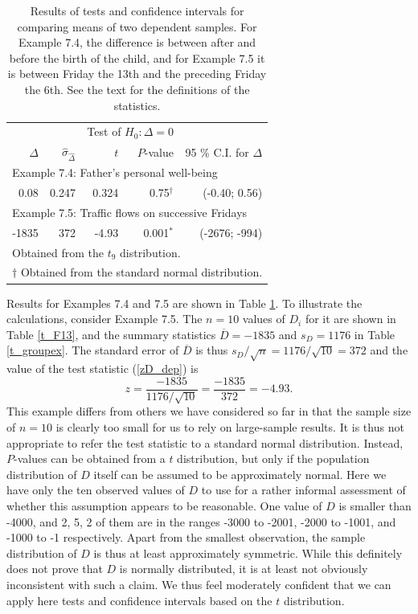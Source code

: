 \begin{table}
\caption{Results of tests and confidence intervals for comparing
means of two dependent samples. For Example 7.4, the difference
is between after and before the birth of the child, and
for Example 7.5 it is between Friday the 13th and the preceding Friday
the 6th.
See the text for the
definitions of the statistics.}
\label{t_2tests_dep}

\begin{center}
\begin{tabular}{|rrrrr|}\hline
& & \multicolumn{2}{r}{Test of $H_{0}: \Delta=0$} & \\
$\hat{\Delta}$& $\hat{\sigma}_{\hat{\Delta}}$& $t$ & $P$-value &
95 \% C.I. for $\Delta$ \\ \hline
\multicolumn{5}{|l|}{Example 7.4: Father's personal well-being}\\
0.08 & 0.247 & 0.324 & 0.75$^{\dagger}$ & (-0.40; 0.56) \\
\hline
\multicolumn{5}{|l|}{Example 7.5: Traffic flows on successive
Fridays}\\
-1835 & 372 & -4.93 & 0.001$^{*}$ & (-2676; -994) \\
\hline
\multicolumn{5}{l}{{\footnotesize * Obtained from the $t_{9}$
distribution.}}\\
\multicolumn{5}{l}{{\footnotesize $\dagger$ Obtained from the
standard normal distribution.}}
\end{tabular}
\end{center}
\end{table}


Results for Examples 7.4 and 7.5 are shown in Table
\ref{t_2tests_dep}. To illustrate the calculations, consider Example
7.5. The $n=10$ values of $D_{i}$ for it are shown in Table \ref{t_F13},
and the summary statistics $\overline{D}=-1835$ and $s_{D}=1176$ in
Table \ref{t_groupex}. The standard error of $\overline{D}$ is thus
$s_{D}/\sqrt{n}=1176/\sqrt{10}=372$ and the value of the test
statistic (\ref{zD_dep}) is
\[
z=\frac{-1835}{1176/\sqrt{10}}=\frac{-1835}{372}=-4.93.
\]
This example differs from others we have considered so far in that the
sample size of $n=10$ is clearly too small for us to rely on
large-sample results. It is thus not appropriate to
refer the test statistic to a standard normal
distribution. Instead, $P$-values can be obtained from a
$t$ distribution, but only if the population distribution of $D$ itself
can be assumed to  be approximately normal. Here we have only
the ten observed values of $D$ to use for a rather informal assessment
of whether this assumption appears to be reasonable. One value of $D$ is
smaller than -4000, and 2, 5, 2 of them are in the ranges -3000 to
-2001, -2000 to -1001, and -1000 to -1 respectively. Apart from the
smallest observation, the sample distribution of $D$ is thus at least
approximately symmetric. While this definitely does not prove that $D$
is normally distributed, it is at least not obviously inconsistent with
such a claim. We thus feel moderately confident that we can apply here
tests
and confidence intervals based on the $t$ distribution.

